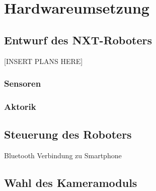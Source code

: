 \chapter{Hardwareumsetzung}
\section{Entwurf des NXT-Roboters}

[INSERT PLANS HERE]
\subsection{Sensoren}
\subsection{Aktorik}

\section{Steuerung des Roboters}
Bluetooth Verbindung zu Smartphone

\section{Wahl des Kameramoduls}
\label{sec:Kamera}
